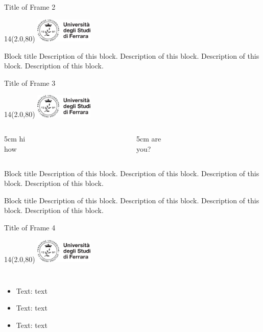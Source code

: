 \documentclass[11pt,xcolor={dvipsnames},default]{beamer} %
\newcommand{\MyLogo}{%
\begin{textblock}{14}(2.0,80)
 \includegraphics[height=1.15cm, angle=0]{logo}
\end{textblock}
}
\begin{document}
\iffalse
\begin{frame}{Title of Frame 2}
\MyLogo
\begin{center}
\begin{alertblock}{Block title}
Description of this block. Description of this block. Description of this block. Description of this block. \\
\end{alertblock}
\vspace{0.8cm}
\end{center}
\end{frame}

\begin{frame}{Title of Frame 3}
\MyLogo
\begin{columns}
\begin{column}[T]{5cm}
hi \\ how
\end{column}
\begin{column}[T]{5cm}
are \\ you?
\end{column}
\end{columns}
\begin{block}{Block title}
Description of this block. Description of this block. Description of this block. Description of this block.
\end{block}
\bigskip \bigskip
\begin{block}{Block title}
Description of this block. Description of this block. Description of this block. Description of this block.
\end{block}
\end{frame}

\begin{frame}{Title of Frame 4}
\MyLogo
\begin{columns}
	\begin{itemize}
  		\item<1-> Text: \alert{text}
  		\item<2-> Text: \alert{text}
		\item<3-> Text: \alert{text}
  	\end{itemize}
\end{columns}
\end{frame}
\end{document}
